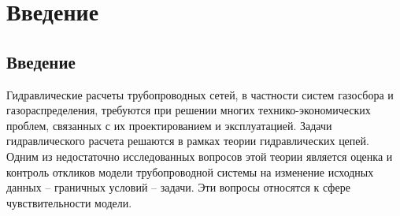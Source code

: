 \chapter{Введение}
\section{Введение}
Гидравлические расчеты трубопроводных сетей, в частности систем газосбора и газораспределения,
требуются при решении многих технико-экономических проблем, связанных с их проектированием и эксплуатацией. 
Задачи гидравлического расчета решаются в рамках теории гидравлических цепей.
Одним из недостаточно исследованных вопросов этой теории является оценка и контроль откликов модели
трубопроводной системы на изменение исходных данных -- граничных условий -- задачи.
Эти вопросы относятся к сфере чувствительности модели.